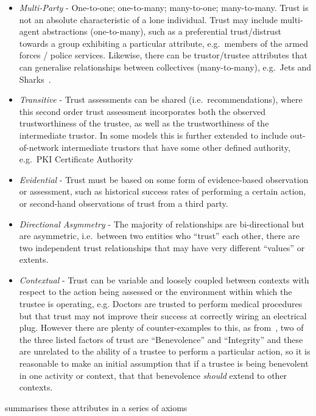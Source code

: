 \begin{itemize}
	\item \emph{Multi-Party} - One-to-one; one-to-many; many-to-one; many-to-many.
	Trust is not an absolute characteristic of a lone individual.
	Trust may include multi-agent abstractions (one-to-many), such as a preferential trust/distrust towards a group exhibiting a particular attribute, e.g.\ members of the armed forces / police services.
	Likewise, there can be trustor/trustee attributes that can generalise relationships between collectives (many-to-many), e.g.\ Jets and Sharks~\cite{Robbins1961}.
	\item \emph{Transitive} - Trust assessments can be shared (i.e.\ recommendations), where this second order trust assessment incorporates both the observed trustworthiness of the trustee, as well as the trustworthiness of the intermediate trustor.
	In some models this is further extended to include out-of-network intermediate trustors that have some other defined authority, e.g.\ PKI Certificate Authority
	\item \emph{Evidential} - Trust must be based on some form of evidence-based observation or assessment, such as historical success rates of performing a certain action, or second-hand observations of trust from a third party.
	\item \emph{Directional Asymmetry} - The majority of relationships are bi-directional but are asymmetric, i.e.\ between two entities who ``trust'' each other, there are two independent trust relationships that may have very different ``values'' or extents.
	\item \emph{Contextual} - Trust can be variable and loosely coupled between contexts with respect to the action being assessed or the environment within which the trustee is operating, e.g.
	Doctors are trusted to perform medical procedures but that trust may not improve their success at correctly wiring an electrical plug.
	However there are plenty of counter-examples to this, as from~\cite{Mayer1995}, two of the three listed factors of trust are ``Benevolence'' and ``Integrity'' and these are unrelated to the ability of a trustee to perform a particular action, so it is reasonable to make an initial assumption that if a trustee is being benevolent in one activity or context, that that benevolence \emph{should} extend to other contexts.
\end{itemize}

\citet{Liu2010} summarises these attributes in a series of axioms 

